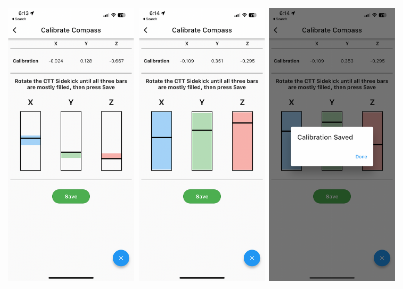 \documentclass[
]{article}
\begin{document}
\includegraphics[width=0.25\textwidth,height=\textheight]{./images/sidekick_compassCalib1.PNG}
\includegraphics[width=0.25\textwidth,height=\textheight]{./images/sidekick_compassCalib2.PNG}
\includegraphics[width=0.25\textwidth,height=\textheight]{./images/sidekick_calibrationSaved.PNG}
\end{document}
